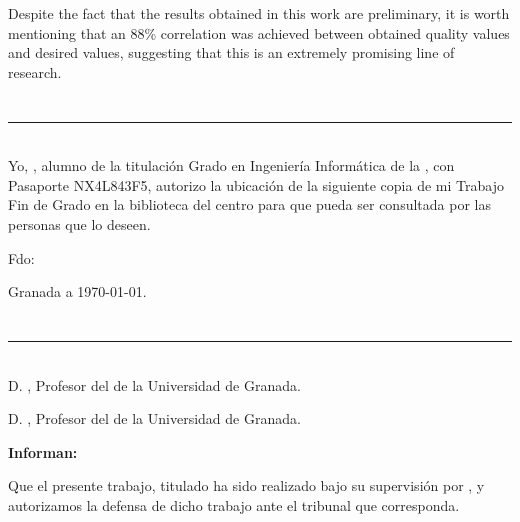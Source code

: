 Despite the fact that the results obtained in this work are preliminary, 
it is worth mentioning that an 88\% correlation was achieved between 
obtained quality values and desired values, 
suggesting that this is an extremely promising line of research.

\chapter*{}
\thispagestyle{empty}

\noindent\rule[-1ex]{\textwidth}{2pt}\\[4.5ex]

Yo, \textbf{\myName}, alumno de la titulación Grado en Ingeniería
Informática  de la \textbf{\myFaculty}, 
con Pasaporte NX4L843F5, autorizo la ubicación de la siguiente copia de mi 
Trabajo Fin de Grado en la biblioteca del centro para que pueda ser
consultada por las personas que lo deseen.

\vspace{6cm}

\noindent Fdo: \myName

\vspace{2cm}

\begin{flushright}
Granada a \today.
\end{flushright}


\chapter*{}
\thispagestyle{empty}

\noindent\rule[-1ex]{\textwidth}{2pt}\\[4.5ex]

D. \textbf{\myProf}, Profesor del \myDepartment de la Universidad de Granada.

\vspace{0.5cm}

D. \textbf{\myOtherProf}, Profesor del \myDepartment de la Universidad de Granada.


\vspace{0.5cm}

\textbf{Informan:}

\vspace{0.5cm}

Que el presente trabajo, titulado \textit{\textbf{\myTitle}}
ha sido realizado bajo su supervisión por \textbf{\myName}, y autorizamos la defensa de dicho trabajo ante el tribunal
que corresponda.

